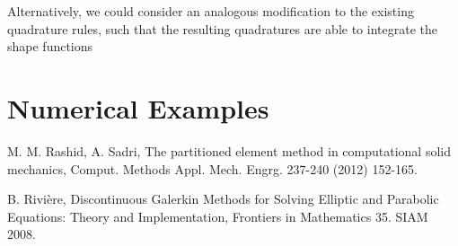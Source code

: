 \documentclass[11pt]{article} %
\begin{document}
Alternatively, we could consider an analogous modification to the existing quadrature rules, such that the resulting quadratures are able to integrate the shape functions 

\section{Numerical Examples}





\begin{thebibliography}{9}

M. M. Rashid, A. Sadri,
The partitioned element method in computational solid mechanics,
Comput. Methods Appl. Mech. Engrg. 237-240 (2012) 152-165.

B. Rivière,
Discontinuous Galerkin Methods for Solving Elliptic and Parabolic Equations: Theory and Implementation,
Frontiers in Mathematics 35. SIAM 2008.

\end{thebibliography}
\end{document}
